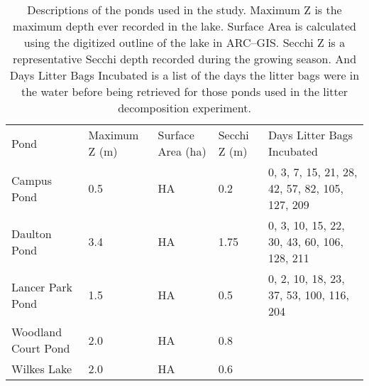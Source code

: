 \begin{table}  
\label{tab:ponds}
\begin{tabular}{l l l l l}
Pond & Maximum Z (m) & Surface Area (ha) & Secchi Z (m) & Days Litter Bags Incubated \\
Campus Pond & 0.5 & HA & 0.2 & 0, 3, 7, 15, 21, 28, 42, 57, 82, 105, 127, 209\\
Daulton Pond & 3.4 & HA & 1.75 & 0, 3, 10, 15, 22, 30, 43, 60, 106, 128, 211\\
Lancer Park Pond & 1.5 & HA & 0.5 & 0, 2, 10, 18, 23, 37, 53, 100, 116, 204\\
Woodland Court Pond & 2.0 & HA & 0.8 & \\
Wilkes Lake & 2.0 & HA & 0.6 \\
\end{tabular}
\caption{Descriptions of the ponds used in the study. Maximum Z is the maximum depth ever recorded in the lake. Surface Area is calculated using the digitized outline of the lake in ARC--GIS. Secchi Z is a representative Secchi depth recorded during the growing season. And Days Litter Bags Incubated is a list of the days the litter bags were in the water before being retrieved for those ponds used in the litter decomposition experiment.}
\end{table}